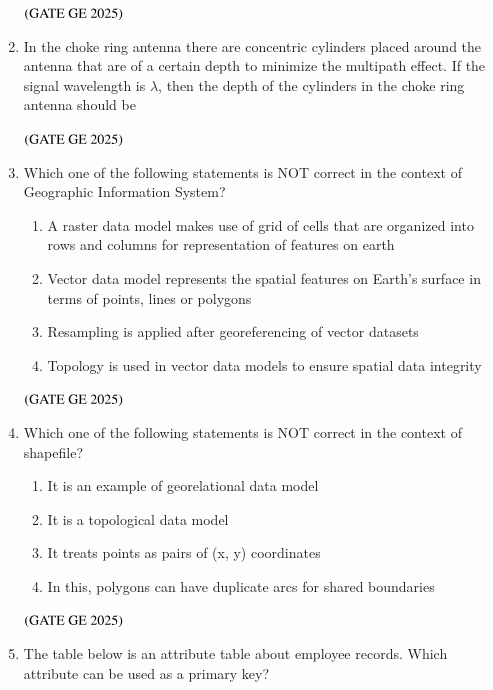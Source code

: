 \documentclass[journal,12pt,onecolumn]{IEEEtran}
\theoremstyle{remark}
\begin{document}
\begin{enumerate}
\begin{enumerate}
\end{enumerate}
\hfill $\left(\text{GATE GE 2025}\right)$
\bigskip
\item In the choke ring antenna there are concentric cylinders placed around the antenna that are of a certain depth to minimize the multipath effect. If the signal wavelength is $\lambda$, then the depth of the cylinders in the choke ring antenna should be
\begin{enumerate}
\end{enumerate}
\hfill $\left(\text{GATE GE 2025}\right)$
\bigskip
\item Which one of the following statements is NOT correct in the context of Geographic Information System?
\begin{enumerate}
\item A raster data model makes use of grid of cells that are organized into rows and columns for representation of features on earth
\item Vector data model represents the spatial features on Earth's surface in terms of points, lines or polygons
\item Resampling is applied after georeferencing of vector datasets
\item Topology is used in vector data models to ensure spatial data integrity
\end{enumerate}
\hfill $\left(\text{GATE GE 2025}\right)$
\bigskip
\item Which one of the following statements is NOT correct in the context of shapefile?
\begin{enumerate}
\item It is an example of georelational data model
\item It is a topological data model
\item It treats points as pairs of (x, y) coordinates
\item In this, polygons can have duplicate arcs for shared boundaries
\end{enumerate}
\hfill $\left(\text{GATE GE 2025}\right)$
\bigskip
\item The table below is an attribute table about employee records. Which attribute can be used as a primary key?

\end{enumerate}
\end{document}

